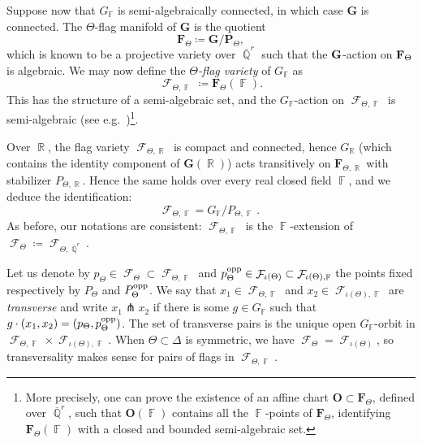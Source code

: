 \documentclass{amsart}
\theoremstyle{plain}
\theoremstyle{definition}
\DeclareMathOperator{\Fc}{\mathcal{F}}
\DeclareMathOperator{\Fb}{{\mathbb{F}}}
\DeclareMathOperator{\Rb}{{\mathbb{R}}}
\DeclareMathOperator{\Qb}{\mathbb{Q}}
\newcommand{\opp}{\textnormal{opp}}
\newcommand{\1}{\mathbf{1}}
\begin{document}
Suppose now that $G_{\Fb}$ is semi-algebraically connected, in which case $\mathbf G$ is connected. The $\Theta$-flag manifold of $\mathbf G$ is the quotient
\[\mathbf F_{\Theta}\coloneqq \mathbf G/\mathbf P_{\Theta},\]
which is known to be a projective variety over $\overline{\Qb}^r$ such that the ${\bf G}$-action on ${\bf F}_\Theta$ is algebraic.
We may now define the \emph{$\Theta$-flag variety} of $G_{\Fb}$ as
\[\Fc_{\Theta,\Fb} \coloneqq \mathbf F_\Theta(\Fb).\]
This has the structure of a semi-algebraic set, and the $G_{\Fb}$-action on $\Fc_{\Theta,\Fb}$ is semi-algebraic (see e.g.\ \cite[Proposition 1.7.6]{Scheiderer_RAG})\footnote{More precisely, one can prove the existence of an affine chart $\mathbf O \subset \mathbf F_\Theta$, defined over $\overline{\Qb}^r$, such that $\mathbf O(\Fb)$ contains all the $\Fb$-points of $\mathbf F_\Theta$, identifying $\mathbf F_\Theta(\Fb)$ with a closed and bounded semi-algebraic set.}.

Over $\Rb$, the flag variety $\Fc_{\Theta, \Rb}$ is compact and connected, hence $G_{\Rb}$ (which contains the identity component of $\mathbf G(\Rb)$) acts transitively on $\mathbf F_{\Theta,\Rb}$ with stabilizer $P_{\Theta,\Rb}$. Hence the same holds over every real closed field $\Fb$, and we deduce the identification:
\[\mathcal F_{\Theta, \Fb} = G_{\Fb}/ P_{\Theta, \Fb}~.\]
As before, our notations are consistent: $\Fc_{\Theta,\Fb}$ is the $\Fb$-extension of $\Fc_\Theta \coloneqq \Fc_{\Theta, \overline{\Qb}^r}$.



Let us denote by $p_\Theta \in \Fc_\Theta \subset \Fc_{\Theta,\Fb}$ and $p_\Theta^\opp\in \Fc_{\iota(\Theta)}\subset \Fc_{\iota(\Theta),\Fb}$ the points fixed respectively by $P_\Theta$ and $P_{\Theta}^\opp$. We say that $x_1\in \Fc_{\Theta,\Fb}$ and $x_2\in \Fc_{\iota(\Theta),\Fb}$ are \emph{transverse} and write $x_1\pitchfork x_2$ if there is some $g\in G_{\Fb}$ such that $g\cdot (x_1,x_2) = (p_\Theta, p_{\Theta}^\opp)$. The set of transverse pairs is the unique open $G_{\Fb}$-orbit in $\Fc_{\Theta,\Fb} \times \Fc_{\iota(\Theta),\Fb}$. When $\Theta\subset\Delta$ is symmetric, we have $\Fc_{\Theta}=\Fc_{\iota(\Theta)}$, so transversality makes sense for pairs of flags in $\Fc_{\Theta,\Fb}$. 
\end{document}
